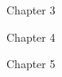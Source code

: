 \begin{description}
    \item[Chapter 3] 
\end{description}

\begin{description}
    \item[Chapter 4] 
\end{description}

\begin{description}
    \item[Chapter 5] 
\end{description}


